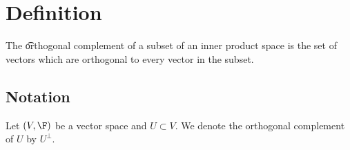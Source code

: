 
\section*{Definition}

The \t{orthogonal complement} of a subset of an inner product space is the set of vectors which are orthogonal to every vector in the subset.

\subsection*{Notation}

Let $(V, \F )$ be a vector space and $U \subset V$.
We denote the orthogonal complement of $U$ by $U^{\perp}$.

\blankpage